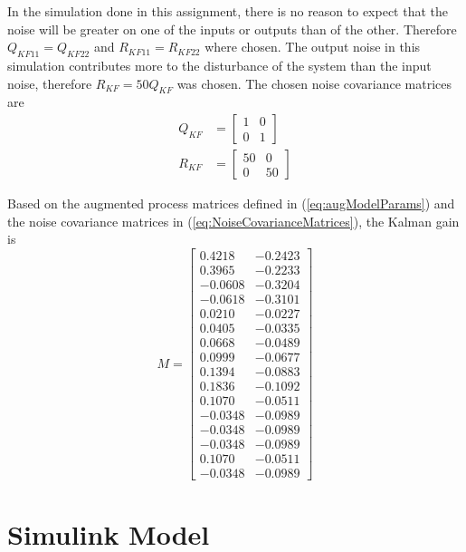 \documentclass[12pt]{article}
\begin{document}
In the simulation done in this assignment, there is no reason to expect that the noise will be greater on one of the inputs or outputs than of the other. Therefore $Q_{KF11}=Q_{KF22}$ and $R_{KF11}=R_{KF22}$ where chosen. The output noise in this simulation contributes more to the disturbance of the system than the input noise, therefore  $R_{KF}=50 Q_{KF}$ was chosen. The chosen noise covariance matrices are
\begin{subequations}
\begin{align}
Q_{KF} &= \begin{bmatrix}
1 & 0 \\
0 & 1
\end{bmatrix} \\
R_{KF} &= \begin{bmatrix}
50 & 0 \\
0 & 50
\end{bmatrix}
\end{align} \label{eq:NoiseCovarianceMatrices}
\end{subequations}

Based on the augmented process matrices defined in (\ref{eq:augModelParams}) and the noise covariance matrices in (\ref{eq:NoiseCovarianceMatrices}), the Kalman gain is
\begin{equation}
M = \begin{bmatrix}
0.4218&   -0.2423 \\
0.3965&   -0.2233\\
-0.0608&   -0.3204\\
-0.0618&  -0.3101\\
0.0210&   -0.0227\\
0.0405&   -0.0335\\
0.0668&   -0.0489\\
0.0999&   -0.0677\\
0.1394&   -0.0883\\
0.1836&   -0.1092\\
0.1070&   -0.0511\\
-0.0348&   -0.0989\\
-0.0348&   -0.0989\\
-0.0348&   -0.0989\\
0.1070&   -0.0511\\
-0.0348&   -0.0989
\end{bmatrix}
\end{equation}

\section{Simulink Model}
\label{sec:SimulinkModel}
\end{document}
